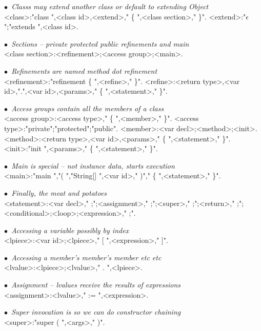 \newcommand{\comment}[1]{{\escapegrammar$\bullet$\it\ #1}\\}

\begin{grammar}

\comment{Classs may extend another class or default to extending Object}
<class>:"class ",<class id>,<extend>," \{ ",<class section>,"{\small *} \}".
<extend>:"$\epsilon$";"extends ",<class id>.

\comment{Sections -- private protected public refinements and main}
<class section>:<refinement>;<access group>;<main>.

\comment{Refinements are named method dot refinement}
<refinement>:"refinement \{ ",<refine>,"{\small *} \}".
<refine>:<return type>,<var id>,".",<var id>,<params>," \{ ",<statement>,"{\small *} \}".

\comment{Access groups contain all the members of a class}
<access group>:<access type>," \{ ",<member>,"{\small *} \}".
<access type>:"private";"protected";"public".
<member>:<var decl>;<method>;<init>.
<method>:<return type>,<var id>,<params>," \{ ",<statement>,"{\small *} \}".
<init>:"init ",<params>," \{ ",<statement>,"{\small *} \}".

\comment{Main is special -- not instance data, starts execution}
<main>:"main ","( ","String[] ",<var id>," )"," \{ ",<statement>,"{\small *} \}".

\comment{Finally, the meat and potatoes}
<statement>:<var decl>," ;";<assignment>," ;";<super>," ;";<return>," ;";<conditional>;<loop>;<expression>," ;".

\comment{Accessing a variable possibly by index}
<lpiece>:<var id>;<lpiece>," [ ",<expression>," ]".

\comment{Accessing a member's member's member etc etc}
<lvalue>:<lpiece>;<lvalue>," . ",<lpiece>.

\comment{Assignment -- lvalues receive the results of expressions}
<assignment>:<lvalue>," := ",<expression>.

\comment{Super invocation is so we can do constructor chaining}
<super>:"super ( ",<args>," )".


\end{grammar}
